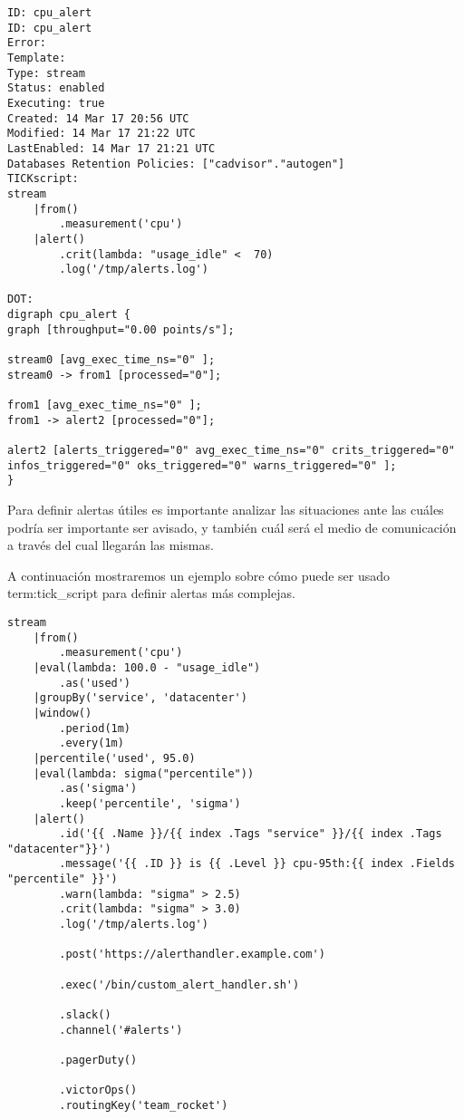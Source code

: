\begin{lstlisting}
ID: cpu_alert
ID: cpu_alert
Error: 
Template: 
Type: stream
Status: enabled
Executing: true
Created: 14 Mar 17 20:56 UTC
Modified: 14 Mar 17 21:22 UTC
LastEnabled: 14 Mar 17 21:21 UTC
Databases Retention Policies: ["cadvisor"."autogen"]
TICKscript:
stream
    |from()
        .measurement('cpu')
    |alert()
        .crit(lambda: "usage_idle" <  70)
        .log('/tmp/alerts.log')

DOT:
digraph cpu_alert {
graph [throughput="0.00 points/s"];

stream0 [avg_exec_time_ns="0" ];
stream0 -> from1 [processed="0"];

from1 [avg_exec_time_ns="0" ];
from1 -> alert2 [processed="0"];

alert2 [alerts_triggered="0" avg_exec_time_ns="0" crits_triggered="0" infos_triggered="0" oks_triggered="0" warns_triggered="0" ];
}
\end{lstlisting}

Para definir alertas útiles es importante analizar las situaciones ante las
cuáles podría ser importante ser avisado, y también cuál será el medio de 
comunicación a través del cual llegarán las mismas.

A continuación mostraremos un ejemplo sobre cómo puede ser usado
\gls{term:tick_script} para definir alertas más complejas.

\begin{lstlisting}
stream
    |from()
        .measurement('cpu')
    |eval(lambda: 100.0 - "usage_idle")
        .as('used')
    |groupBy('service', 'datacenter')
    |window()
        .period(1m)
        .every(1m)
    |percentile('used', 95.0)
    |eval(lambda: sigma("percentile"))
        .as('sigma')
        .keep('percentile', 'sigma')
    |alert()
        .id('{{ .Name }}/{{ index .Tags "service" }}/{{ index .Tags "datacenter"}}')
        .message('{{ .ID }} is {{ .Level }} cpu-95th:{{ index .Fields "percentile" }}')
        .warn(lambda: "sigma" > 2.5)
        .crit(lambda: "sigma" > 3.0)
        .log('/tmp/alerts.log')

        .post('https://alerthandler.example.com')

        .exec('/bin/custom_alert_handler.sh')

        .slack()
        .channel('#alerts')

        .pagerDuty()

        .victorOps()
        .routingKey('team_rocket')
\end{lstlisting}


